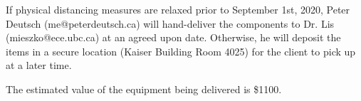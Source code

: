\documentclass[10pt,letterpaper]{article}
\begin{document}
If physical distancing measures are relaxed prior to September 1st, 2020, Peter Deutsch (me@peterdeutsch.ca) will hand-deliver the components to Dr. Lis (mieszko@ece.ubc.ca) at an agreed upon date. Otherwise, he will deposit the items in a secure location (Kaiser Building Room 4025) for the client to pick up at a later time. 

The estimated value of the equipment being delivered is \$1100.

\end{document}
